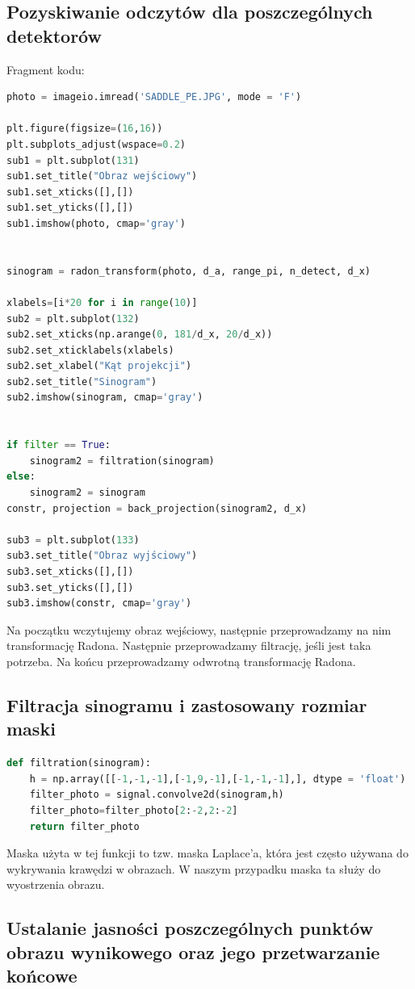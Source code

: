 \documentclass[11pt,a4paper]{article}
\begin{document}
    \subsection{Pozyskiwanie odczytów dla poszczególnych detektorów}
    Fragment kodu:
\begin{lstlisting}[language=Python, basicstyle=\normal, breaklines=true]
photo = imageio.imread('SADDLE_PE.JPG', mode = 'F')

plt.figure(figsize=(16,16))
plt.subplots_adjust(wspace=0.2)
sub1 = plt.subplot(131)
sub1.set_title("Obraz wejściowy")
sub1.set_xticks([],[])
sub1.set_yticks([],[])
sub1.imshow(photo, cmap='gray')


sinogram = radon_transform(photo, d_a, range_pi, n_detect, d_x)

xlabels=[i*20 for i in range(10)]
sub2 = plt.subplot(132)
sub2.set_xticks(np.arange(0, 181/d_x, 20/d_x))
sub2.set_xticklabels(xlabels)
sub2.set_xlabel("Kąt projekcji")
sub2.set_title("Sinogram")
sub2.imshow(sinogram, cmap='gray')


if filter == True:
    sinogram2 = filtration(sinogram)
else:
    sinogram2 = sinogram
constr, projection = back_projection(sinogram2, d_x)

sub3 = plt.subplot(133)
sub3.set_title("Obraz wyjściowy")
sub3.set_xticks([],[])
sub3.set_yticks([],[])
sub3.imshow(constr, cmap='gray')
    \end{lstlisting}
    Na początku wczytujemy obraz wejściowy, następnie przeprowadzamy na nim transformację Radona.
    Następnie przeprowadzamy filtrację, jeśli jest taka potrzeba.
    Na końcu przeprowadzamy odwrotną transformację Radona.
    \subsection{Filtracja sinogramu i zastosowany rozmiar maski}
\begin{lstlisting}[language=Python, basicstyle=\normal, breaklines=true]
def filtration(sinogram):
    h = np.array([[-1,-1,-1],[-1,9,-1],[-1,-1,-1],], dtype = 'float')
    filter_photo = signal.convolve2d(sinogram,h)
    filter_photo=filter_photo[2:-2,2:-2]
    return filter_photo
\end{lstlisting}
    Maska użyta w tej funkcji to tzw.
    maska Laplace'a, która jest często używana do wykrywania krawędzi w obrazach.
    W naszym przypadku maska ta służy do wyostrzenia obrazu.
    \subsection{Ustalanie jasności poszczególnych punktów obrazu wynikowego oraz jego przetwarzanie końcowe}
\end{document}
